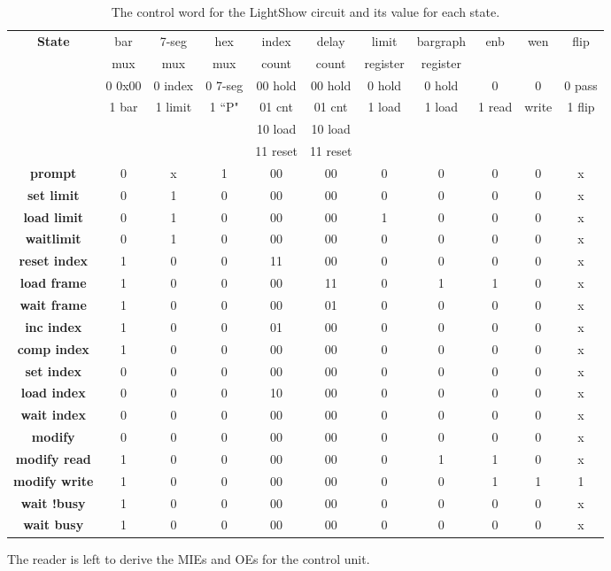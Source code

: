 \begin{table}
{\tiny
\begin{tabular}{c||c|c|c|c|c|c|c|c|c|c}
\textbf{ State } 	& bar & 7-seg & hex & index & delay & limit    & bargraph & enb & wen   & flip \\  
                    & mux & mux   & mux & count & count & register & register &          &         &       \\  \hline \hline
    & 0 0x00 & 0 index & 0 7-seg & 00 hold & 00 hold & 0 hold & 0 hold   & 0       & 0       &0 pass \\ 
    & 1 bar	& 1 limit & 1 ``P"& 01 cnt & 01 cnt & 1 load &    1 load              & 1 read & write   & 1 flip \\
    & 	&     &     & 10 load & 10 load & & &  \\
    & 	&     &	    & 11 reset	& 11 reset & & \\ \hline \hline
\textbf{ prompt } 	 & 	0 &	x &	1 &	00 &	00 &	0 &	0 &	0 &	0 & x \\ \hline
\textbf{ set limit }  & 	0 &	1 &	0 &	00 &	00 &	0 &	0 &	0 &	0 & x \\ \hline
\textbf{ load limit } &	0 &	1 &	0 &	00 &	00 &	1 &	0 &	0 &	0 & x \\ \hline
\textbf{ waitlimit } &	0 &	1 &	0 &	00 &	00 &	0 &	0 &	0 &	0 & x \\ \hline
\textbf{ reset index } &	1 &	0 & 	0 &	11 &	00 &	0 &	0 &	0 &	0 & x \\ \hline
\textbf{ load frame } &	1 &	0 &	0 &	00 &	11 &	0 &	1 &	1 &	0 & x \\ \hline
\textbf{ wait frame } &	1 &	0 &	0 &	00 &	01 &	0 &	0 &	0 &	0 & x \\ \hline
\textbf{ inc index } &	1 &	0 &	0 &	01 &	00 &	0 &	0 &	0 &	0 & x \\ \hline
\textbf{ comp index } &	1 &	0 &	0 &	00 &	00 &	0 &	0 &	0 &	0 & x \\ \hline
\textbf{ set index } &	0 &	0 &	0 &	00 & 	00 &	0 & 	0 &	0 &	0 & x \\ \hline
\textbf{ load index } &	0 &	0 & 	0 &	10 &	00 &	0 &	0 &	0 & 0 & x \\ \hline
\textbf{ wait index } &	0 &	0 &	0 &	00 &	00 &	0 &	0 &	0 &	0 & x \\ \hline
\textbf{ modify	} &	0 &	0 &	0 &	00 &	00 &	0 &	0 &	0 &	0 & x \\ \hline
\textbf{ modify read} &	1 &	0 &	0 &	00 &	00 &	0 &	1 &	1 &	0 & x \\ \hline
\textbf{ modify write } &	1 &	0 &	0 &	00 &	00 &	0 &	0 & 	1 &	1 & 1 \\ \hline
\textbf{ wait !busy } &	1 &	0 &	0 &	00 &	00 &	0 &	0 &	0 &	0 & x \\ \hline
\textbf{ wait busy } &	1 &	0 &	0 &	00 &	00 &	0 &	0 &	0 &	0 & x \\ 
\end{tabular} 
}
\caption{The control word for the LightShow circuit and its value for each state.}
\label{table:LightShow}
\end{table}

The reader is left to derive the MIEs and OEs for the control unit.

